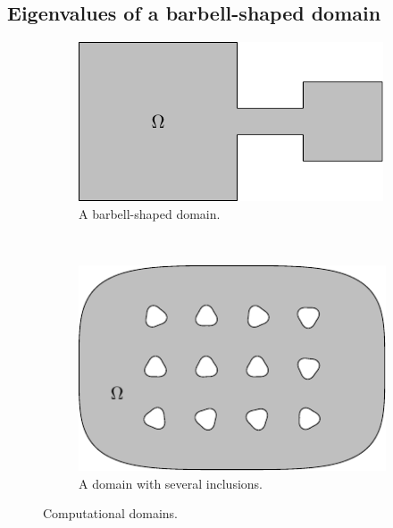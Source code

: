 \subsection{Eigenvalues of a barbell-shaped domain}
\label{subsec:barbell}

\begin{figure}
  \centering
  \begin{subfigure}[t]{0.4\textwidth}
    \centering
    \includegraphics[width=\textwidth]{fig/ex_barbell_001_bdry}
    \caption{A barbell-shaped domain.}
    \label{subfig:barbell_bdry}
  \end{subfigure}
  ~
  \begin{subfigure}[t]{0.4\textwidth}
    \centering
    \includegraphics[width=\textwidth]{fig/ex_many_holes_004_bdry}
    \caption{A domain with several inclusions.}
    \label{subfig:many_inclusions_bdry}
  \end{subfigure}
  \caption{Computational domains.}
\end{figure}

